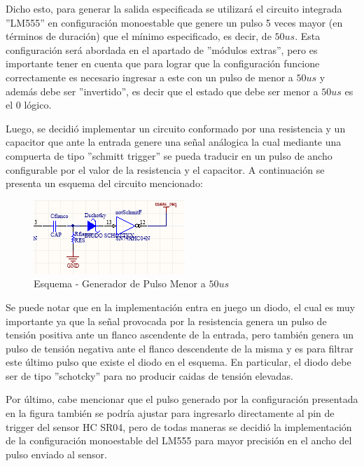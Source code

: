 Dicho esto, para generar la salida especificada se utilizará el circuito
integrada ''LM555'' en configuración monoestable que genere un pulso
5 veces mayor (en términos de duración) que el mínimo especificado,
es decir, de $50us$. Esta configuración será abordada en el apartado
de ''módulos extras'', pero es importante tener en cuenta que para
lograr que la configuración funcione correctamente es necesario ingresar
a este con un pulso de menor a $50us$ y además debe ser ''invertido'',
es decir que el estado que debe ser menor a $50us$ es el 0
lógico.\newline

Luego, se decidió implementar un circuito conformado por una resistencia
y un capacitor que ante la entrada genere una señal análogica la cual
mediante una compuerta de tipo ''schmitt trigger'' se pueda traducir
en un pulso de ancho configurable por el valor de la resistencia y
el capacitor. A continuación se presenta un esquema del circuito mencionado:

\begin{figure}[H]
\begin{centering}
\includegraphics[scale=1]{generadorDePulsoMenor50us.PNG}
\par\end{centering}
\caption{Esquema - Generador de Pulso Menor a $50us$}
\end{figure}

Se puede notar que en la implementación entra en juego un diodo, el
cual es muy importante ya que la señal provocada por la resistencia
genera un pulso de tensión positiva ante un flanco ascendente de la
entrada, pero también genera un pulso de tensión negativa ante el
flanco descendente de la misma y es para filtrar este último pulso
que existe el diodo en el esquema. En particular, el diodo debe ser
de tipo ''schotcky'' para no producir caidas de tensión elevadas.

Por último, cabe mencionar que el pulso generado por la configuración
presentada en la figura también se podría ajustar para ingresarlo
directamente al pin de trigger del sensor HC SR04, pero de todas maneras
se decidió la implementación de la configuración monoestable del LM555
para mayor precisión en el ancho del pulso enviado al sensor.

